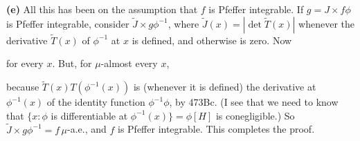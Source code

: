 {

\medskip

{\bf (e)} All this has been on the assumption that $f$ is Pfeffer
integrable.   If $g=J\times f\phi$ is Pfeffer integrable, consider
$\tilde J\times g\phi^{-1}$, where $\tilde J(x)=|\det\tilde T(x)|$
whenever the derivative $\tilde T(x)$ of $\phi^{-1}$ at $x$ is defined,
and otherwise is zero.   Now


\noindent for every $x$.   But, for $\mu$-almost every $x$,


\noindent because $\tilde T(x)T(\phi^{-1}(x))$ is (whenever it is
defined) the derivative at $\phi^{-1}(x)$ of the identity function
$\phi^{-1}\phi$, by 473Bc.   (I see that we need to know that
$\{x:\phi$ is differentiable at $\phi^{-1}(x)\}=\phi[H]$ is
conegligible.)   So $\tilde J\times g\phi^{-1}=f\,\mu$-a.e., and
$f$ is Pfeffer integrable.   This completes the proof.
}%

